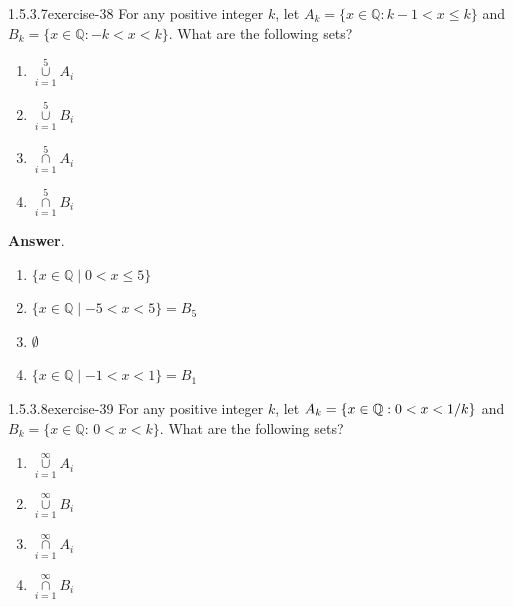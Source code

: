 \documentclass[twoside,10pt,]{book}
\numberwithin{equation}{section}
\begin{document}
\begin{divisionsolution}{1.5.3.7}{}{exercise-38}%
\hypertarget{p-535}{}%
For any positive integer \(k\), let \(A_k = \{x \in \mathbb{Q}:k-1 < x \leq k\}\) and \(B_k = \{x \in \mathbb{Q}: -k < x < k\}\). What are the following sets?%
\par
\hypertarget{p-536}{}%
\leavevmode%
\begin{multicols}{2}
\begin{enumerate}[label=(\alph*)]
\item\hypertarget{li-381}{}\hypertarget{p-537}{}%
\(\underset{i=1}{\overset{5}{\cup }}A_i\)%
\item\hypertarget{li-382}{}\hypertarget{p-538}{}%
\(\underset{i=1}{\overset{5}{\cup }}B_i\)%
\item\hypertarget{li-383}{}\hypertarget{p-539}{}%
\(\underset{i=1}{\overset{5}{\cap }}A_i\)%
\item\hypertarget{li-384}{}\hypertarget{p-540}{}%
\(\underset{i=1}{\overset{5}{\cap }}B_i\)%
\end{enumerate}
\end{multicols}
%
\par\smallskip%
\noindent\textbf{Answer}.\quad%
\hypertarget{p-541}{}%
\leavevmode%
\begin{multicols}{2}
\begin{enumerate}[label=(\alph*)]
\item\hypertarget{li-385}{}\hypertarget{p-542}{}%
\(\{x\in \mathbb{Q}\mid 0 < x \leq 5\}\)%
\item\hypertarget{li-386}{}\hypertarget{p-543}{}%
\(\{x\in \mathbb{Q}\mid -5 < x < 5\}=B_5\)%
\item\hypertarget{li-387}{}\hypertarget{p-544}{}%
\(\emptyset\)%
\item\hypertarget{li-388}{}\hypertarget{p-545}{}%
\(\{x\in \mathbb{Q}\mid -1 < x < 1\}=B_1\)%
\end{enumerate}
\end{multicols}
%
\end{divisionsolution}%
\begin{divisionsolution}{1.5.3.8}{}{exercise-39}%
\hypertarget{p-546}{}%
For any positive integer \(k\), let \(A_k = \{x \in \mathbb{Q}:\text0 < x < 1/k\}\) and \(B _k = \{x \in \mathbb{Q}:\,0 < x < k\}\). What are the following sets?%
\par
\hypertarget{p-547}{}%
\leavevmode%
\begin{multicols}{2}
\begin{enumerate}[label=(\alph*)]
\item\hypertarget{li-389}{}\hypertarget{p-548}{}%
\(\underset{i=1}{\overset{\infty }{\cup }}A_i\)%
\item\hypertarget{li-390}{}\hypertarget{p-549}{}%
\(\underset{i=1}{\overset{\infty }{\cup }}B_i\)%
\item\hypertarget{li-391}{}\hypertarget{p-550}{}%
\(\underset{i=1}{\overset{\infty }{\cap }}A_i\)%
\item\hypertarget{li-392}{}\hypertarget{p-551}{}%
\(\underset{i=1}{\overset{\infty }{\cap }}B_i\)%
\end{enumerate}
\end{multicols}
%
\end{divisionsolution}%
\end{document}
